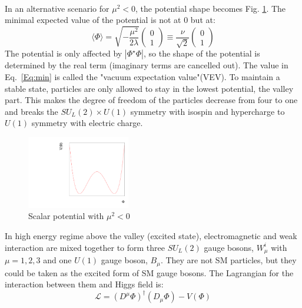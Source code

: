 \\In an alternative scenario for $\mu^2 < 0$, the potential shape becomes Fig. \ref{Fig:higgs}. The minimal expected value of the potential is not at 0 but at:
\begin{equation}
\label{Eq:min}
\langle\Phi\rangle=\sqrt{-\frac{\mu^2}{2\lambda}}\left ( \begin{array}{c} 0 \\ 1 \end{array} \right) \equiv\frac{\nu}{\sqrt{2}}\left ( \begin{array}{c} 0 \\ 1 \end{array} \right)
\end{equation}
The potential is only affected by $|\Phi^\star\Phi|$, so the shape of the potential is determined by the real term (imaginary terms are cancelled out). The value in Eq.~\ref{Eq:min} is called the "vacuum expectation value"(VEV). To maintain a stable state, particles are only allowed to stay in the lowest potential, the valley part. This makes the degree of freedom of the particles decrease from four to one and breaks the $SU_L(2)\times U(1)$ symmetry with isospin and hypercharge to $U(1)$ symmetry with electric charge.  
\begin{figure}[!h]                
	\includegraphics[width=0.4\textwidth]{Chapter1/higgs.pdf}
	\centering
	\begin{center}
		\caption{Scalar potential with $\mu^2 < 0$}
		\label{Fig:higgs}            
	\end{center}
\end{figure}
In high energy regime above the valley (excited state), electromagnetic and weak interaction are mixed together to form three $SU_L(2)$ gauge bosons, $W^i_\mu$ with $\mu =1,2,3$ and one $U(1)$ gauge boson, $B_\mu$. They are not SM particles, but they could be taken as the excited form of SM gauge bosons. The Lagrangian for the interaction between them and Higgs field is:
\begin{equation}
 \mathcal{L}=(D^\mu\Phi)^\dagger(D_\mu\Phi) - V(\Phi) 
\end{equation}
